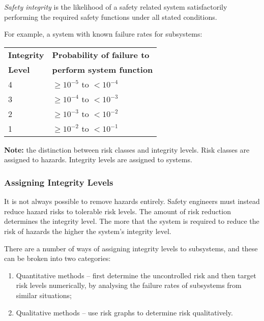   \begin{definition}
   \emph{Safety integrity} is the likelihood of a safety related 
    system satisfactorily performing the required safety functions under 
    all stated conditions.
   \end{definition}


     For example, a system with known failure rates for subsystems:

    \begin{center}
        \begin{tabular}{ll}
        \toprule
        \textbf{Integrity} & \textbf{Probability of failure to} \\
        \textbf{Level}    & \textbf{perform system function}   \\
        \midrule
        4 & $\ge 10^{-5}$ to $<10^{-4}$ \\
        3 & $\ge 10^{-4}$ to $<10^{-3}$ \\
        2 & $\ge 10^{-3}$ to $<10^{-2}$ \\
        1 & $\ge 10^{-2}$ to $<10^{-1}$ \\
        \bottomrule
        \end{tabular}
    \end{center}

    \textbf{Note:} the distinction between risk classes and 
    integrity levels.  Risk classes are assigned to hazards.  Integrity 
    levels are assigned to systems.
    




  \subsubsection*{Assigning Integrity Levels}


   It is not always possible to remove hazards entirely. Safety engineers must instead reduce hazard risks to tolerable risk levels. The amount of risk reduction determines the integrity level.  
    The more that the system is required to reduce the risk of hazards 
    the higher the system's integrity level.
    
    There are a number of ways of assigning integrity levels to 
    subsystems, and these can be broken into two categories:

        \begin{enumerate}

            \item Quantitative methods -- first determine the
            uncontrolled risk and then target risk levels numerically,
            by analysing the failure rates of subsystems from similar
            situations;
            
            \item Qualitative methods -- use risk graphs to determine
            risk qualitatively.
        
        \end{enumerate}



